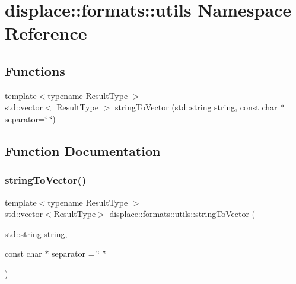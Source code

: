\hypertarget{namespacedisplace_1_1formats_1_1utils}{}\section{displace\+::formats\+::utils Namespace Reference}
\label{namespacedisplace_1_1formats_1_1utils}
\subsection*{Functions}
\begin{DoxyCompactItemize}
\item 
{\footnotesize template$<$typename Result\+Type $>$ }\\std\+::vector$<$ Result\+Type $>$ \mbox{\hyperlink{namespacedisplace_1_1formats_1_1utils_a0a7feef1a4dbe149eb1a2f222d06fa5b}{string\+To\+Vector}} (std\+::string string, const char $\ast$separator=\char`\"{} \char`\"{})
\end{DoxyCompactItemize}


\subsection{Function Documentation}
\mbox{\label{namespacedisplace_1_1formats_1_1utils_a0a7feef1a4dbe149eb1a2f222d06fa5b}} 
\subsubsection{\texorpdfstring{stringToVector()}{stringToVector()}}
{\footnotesize\ttfamily template$<$typename Result\+Type $>$ \\
std\+::vector$<$Result\+Type$>$ displace\+::formats\+::utils\+::string\+To\+Vector (\begin{DoxyParamCaption}\item[{std\+::string}]{string,  }\item[{const char $\ast$}]{separator = {\ttfamily \char`\"{}~\char`\"{}} }\end{DoxyParamCaption})}

